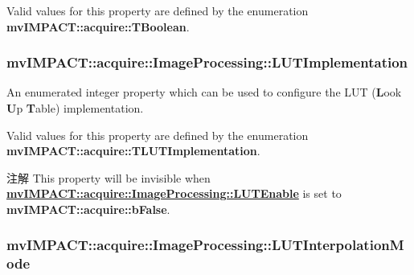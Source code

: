 Valid values for this property are defined by the enumeration {\bfseries mv\+I\+M\+P\+A\+C\+T\+::acquire\+::\+T\+Boolean}. \hypertarget{classmv_i_m_p_a_c_t_1_1acquire_1_1_image_processing_ab63796c1475d375fc872f0b11a102777}{
\subsubsection[{L\+U\+T\+Implementation}]{ mv\+I\+M\+P\+A\+C\+T\+::acquire\+::\+Image\+Processing\+::\+L\+U\+T\+Implementation}}\label{classmv_i_m_p_a_c_t_1_1acquire_1_1_image_processing_ab63796c1475d375fc872f0b11a102777}


An enumerated integer property which can be used to configure the L\+U\+T ({\bfseries L}ook {\bfseries U}p {\bfseries T}able) implementation. 

Valid values for this property are defined by the enumeration {\bfseries mv\+I\+M\+P\+A\+C\+T\+::acquire\+::\+T\+L\+U\+T\+Implementation}.

\begin{DoxyNote}{注解}
This property will be invisible when {\bfseries \hyperlink{classmv_i_m_p_a_c_t_1_1acquire_1_1_image_processing_a7f8eb83578d97fde3405e6ae5d09e5c3}{mv\+I\+M\+P\+A\+C\+T\+::acquire\+::\+Image\+Processing\+::\+L\+U\+T\+Enable}} is set to {\bfseries mv\+I\+M\+P\+A\+C\+T\+::acquire\+::b\+False}. 
\end{DoxyNote}
\hypertarget{classmv_i_m_p_a_c_t_1_1acquire_1_1_image_processing_a5ce44c89f01342416d0c3d37c16056cb}{
\subsubsection[{L\+U\+T\+Interpolation\+Mode}]{ mv\+I\+M\+P\+A\+C\+T\+::acquire\+::\+Image\+Processing\+::\+L\+U\+T\+Interpolation\+Mode}}\label{classmv_i_m_p_a_c_t_1_1acquire_1_1_image_processing_a5ce44c89f01342416d0c3d37c16056cb}


